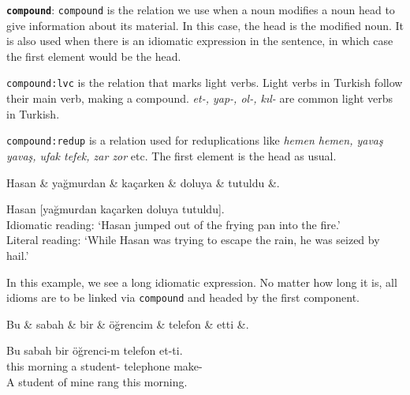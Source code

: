 \documentclass[11pt,a4paper]{article}
\begin{document}
\textbf{\texttt{compound}}:
\texttt{compound} is the relation we use when a noun modifies a noun head to give information about its material. In this case, the head is the modified noun. It is also used when there is an idiomatic expression in the sentence, in which case the first element would be the head.

\texttt{compound:lvc} is the relation that marks light verbs. Light verbs in Turkish follow their main verb, making a compound. \textit{et-, yap-, ol-, kıl-} are common light verbs in Turkish.

\texttt{compound:redup} is a relation used for reduplications like \textit{hemen hemen, yavaş yavaş, ufak tefek, zar zor} etc. The first element is the head as usual.

\begin{exe}
\ex \label{compound}
\begin{dependency}[column sep=0.28cm]
\begin{deptext}
Hasan \& yağmurdan \& kaçarken \& doluya \& tutuldu \&. \\
\end{deptext}
\end{dependency}
\gll Hasan [yağmurdan kaçarken doluya tutuldu]. \\
Idiomatic reading: ‘Hasan jumped out of the frying pan into the fire.’\\
\glt Literal reading: ‘While Hasan was trying to escape the rain, he was seized by hail.'
\end{exe}

In this example, we see a long idiomatic expression. No matter how long it is, all idioms are to be linked via \texttt{compound} and headed by the first component.

\begin{exe}
\ex \label{compound:lvc}
\begin{dependency}
\begin{deptext}[column sep=0.25cm]
Bu \& sabah \& bir \& öğrencim \& telefon \& etti \&. \\
\end{deptext}
\end{dependency}
\gll Bu sabah bir öğrenci-m telefon et-ti. \\
this morning a student-\Fsg{} telephone make-\Pst{} \\
\glt A student of mine rang this morning.
\end{exe}
\end{document}
